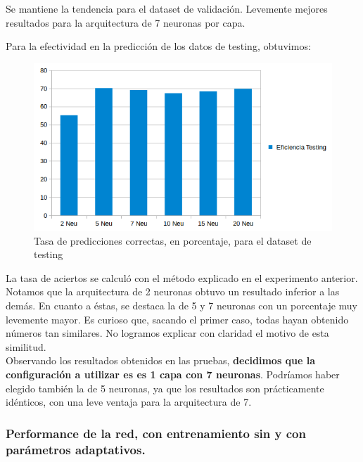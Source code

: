 \newpage

Se mantiene la tendencia para el dataset de validación. Levemente mejores resultados para la arquitectura de 7 neuronas por capa.

Para la efectividad en la predicción de los datos de testing, obtuvimos:\\

\begin{figure}[h]
  \begin{center}
  \includegraphics[scale=0.70]{graficos/ej2_cant_neuro_testing.png}
  \caption{Tasa de predicciones correctas, en porcentaje, para el dataset de testing}
  \end{center}
\end{figure}

La tasa de aciertos se calculó con el método explicado en el experimento anterior. Notamos que la arquitectura de 2 neuronas obtuvo un resultado inferior a las demás. En cuanto a éstas, se destaca la de 5 y 7 neuronas con un porcentaje muy levemente mayor. Es curioso que, sacando el primer caso, todas hayan obtenido números tan similares. No logramos explicar con claridad el motivo de esta similitud.\\

Observando los resultados obtenidos en las pruebas, \textbf{decidimos que la configuración a utilizar es es 1 capa con 7 neuronas}. Podríamos haber elegido también la de 5 neuronas, ya que los resultados son prácticamente idénticos, con una leve ventaja para la arquitectura de 7.\\

\subsubsection{Performance de la red, con entrenamiento sin y con parámetros adaptativos.}

